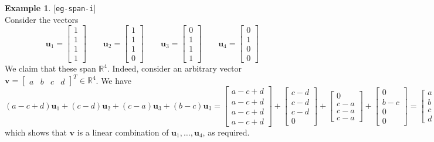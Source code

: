 \documentclass{amsart}
\newcommand{\lbl}[1]{\label{#1}\textup{[\texttt{#1}]}\ \\}
\newcommand{\lbl}{\label}
\newcommand{\R}         {{\mathbb{R}}}
\newcommand{\bsm}       {\left[\begin{smallmatrix}}
\newcommand{\esm}       {\end{smallmatrix}\right]}
\newcommand{\vu}        {\mathbf{u}}
\newcommand{\vv}        {\mathbf{v}}
\renewcommand{\:}       {\colon}
\theoremstyle{definition}
\newtheorem{example}[theorem]{Example}
\begin{document}
\begin{example}\lbl{eg-span-i}
 Consider the vectors
 \[ \vu_1 = \bsm 1\\1\\1\\1 \esm \hspace{2em}
    \vu_2 = \bsm 1\\1\\1\\0 \esm \hspace{2em}
    \vu_3 = \bsm 0\\1\\1\\1 \esm \hspace{2em}
    \vu_4 = \bsm 0\\1\\0\\0 \esm 
 \]
 We claim that these span $\R^4$.  Indeed, consider an
 arbitrary vector $\vv=\bsm a&b&c&d\esm^T\in\R^4$.  We have 
 \[ (a-c+d)\vu_1 + (c-d)\vu_2 + 
    (c-a)\vu_3 + (b-c)\vu_3 = 
    \bsm a-c+d\\ a-c+d\\ a-c+d\\ a-c+d\esm + 
    \bsm c-d\\ c-d\\ c-d\\ 0\esm +
    \bsm 0\\ c-a\\ c-a\\ c-a\esm +
    \bsm 0\\ b-c\\ 0\\ 0 \esm = 
    \bsm a \\ b \\ c \\ d \esm = \vv,
 \]
 which shows that $\vv$ is a linear combination of
 $\vu_1,\dotsc,\vu_4$, as required.


\end{example}
\end{document}
